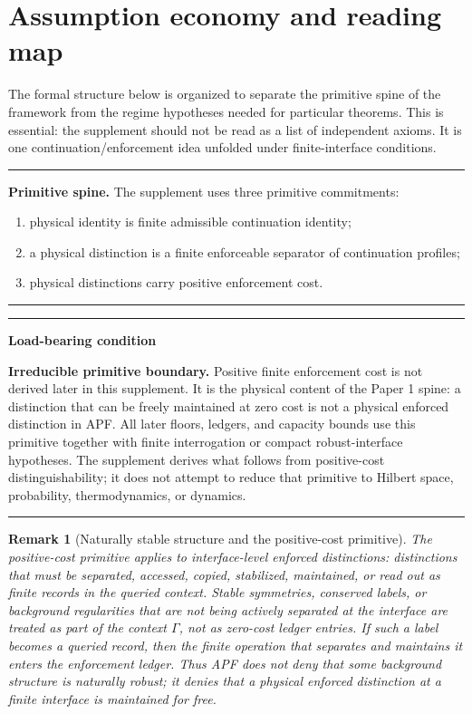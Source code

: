 \documentclass[11pt]{article}
\newtheorem{remark}[theorem]{Remark}
\newenvironment{apfbox}{\par\medskip\hrule\vspace{0.5em}}{\vspace{0.5em}\hrule\par\medskip}
\newenvironment{warningbox}{\par\medskip\hrule\vspace{0.4em}\textbf{Load-bearing condition}\par\vspace{0.3em}}{\vspace{0.5em}\hrule\par\medskip}
\begin{document}
\section{Assumption economy and reading map}\label{sec:assumption-economy}

The formal structure below is organized to separate the primitive spine of the framework from the regime hypotheses needed for particular theorems.  This is essential: the supplement should not be read as a list of independent axioms.  It is one continuation/enforcement idea unfolded under finite-interface conditions.

\begin{apfbox}
\textbf{Primitive spine.}  The supplement uses three primitive commitments:
\begin{enumerate}[label=(\roman*),leftmargin=2em]
\item physical identity is finite admissible continuation identity;
\item a physical distinction is a finite enforceable separator of continuation profiles;
\item physical distinctions carry positive enforcement cost.
\end{enumerate}
\end{apfbox}

\begin{warningbox}
\textbf{Irreducible primitive boundary.}  Positive finite enforcement cost is not derived later in this supplement.  It is the physical content of the Paper 1 spine: a distinction that can be freely maintained at zero cost is not a physical enforced distinction in APF.  All later floors, ledgers, and capacity bounds use this primitive together with finite interrogation or compact robust-interface hypotheses.  The supplement derives what follows from positive-cost distinguishability; it does not attempt to reduce that primitive to Hilbert space, probability, thermodynamics, or dynamics.
\end{warningbox}

\begin{remark}[Naturally stable structure and the positive-cost primitive]\label{rem:naturally-stable-cost}
The positive-cost primitive applies to \emph{interface-level enforced distinctions}: distinctions that must be separated, accessed, copied, stabilized, maintained, or read out as finite records in the queried context.  Stable symmetries, conserved labels, or background regularities that are not being actively separated at the interface are treated as part of the context $\Gamma$, not as zero-cost ledger entries.  If such a label becomes a queried record, then the finite operation that separates and maintains it enters the enforcement ledger.  Thus APF does not deny that some background structure is naturally robust; it denies that a \emph{physical enforced distinction} at a finite interface is maintained for free.
\end{remark}
\end{document}
